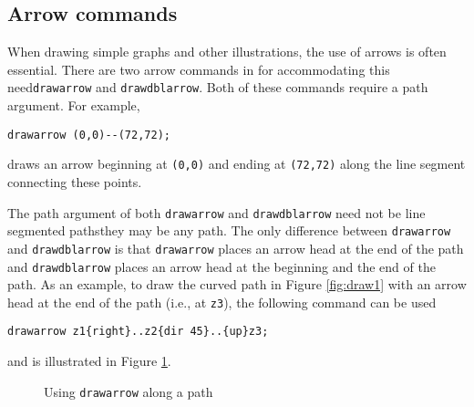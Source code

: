 \subsection{Arrow commands}

When drawing simple graphs and other illustrations, the use of arrows is often essential.  There are two arrow commands in \MP{} for accommodating this need\Dash \texttt{drawarrow} and \texttt{drawdblarrow}.  Both of these commands require a path argument.  For example, \begin{center}\verb|drawarrow (0,0)--(72,72);|\end{center} draws an arrow beginning at \verb|(0,0)| and ending at \verb|(72,72)| along the line segment connecting these points.

The path argument of both \texttt{drawarrow} and \texttt{drawdblarrow} need not be line segmented paths\Dash they may be any \MP{} path.  The only difference between \texttt{drawarrow} and \texttt{drawdblarrow} is that \texttt{drawarrow} places an arrow head at the end of the path and \texttt{drawdblarrow} places an arrow head at the beginning and the end of the path.  As an example, to draw the curved path in Figure \ref{fig:draw1} with an arrow head at the end of the path (i.e., at \texttt{z3}), the following command can be used \begin{center}\verb|drawarrow z1{right}..z2{dir 45}..{up}z3;|\end{center} and is illustrated in Figure \ref{fig:draw2}.
\begin{figure}[ht]
	\begin{center}\end{center}
	\caption{Using \texttt{drawarrow} along a path}\label{fig:draw2}
\end{figure}
